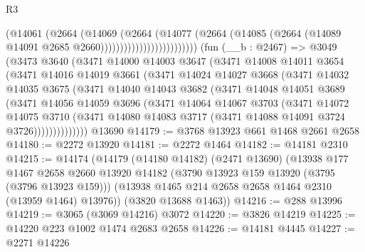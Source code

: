 \begin{lexlean}{R3}
\begin{coremodule}
                                    (@14061
                                      (@2664
                                        (@14069
                                          (@2664
                                            (@14077
                                              (@2664
                                                (@14085
                                                  (@2664
                                                    (@14089
                                                      @14091
                                                      @2685
                                                      @2660)))))))))))))))))))))))))
    (fun (__b : @2467) =>
    @3049
      (@3473
        @3640
        (@3471
          @14000
          @14003
          @3647
          (@3471
            @14008
            @14011
            @3654
            (@3471
              @14016
              @14019
              @3661
              (@3471
                @14024
                @14027
                @3668
                (@3471
                  @14032
                  @14035
                  @3675
                  (@3471
                    @14040
                    @14043
                    @3682
                    (@3471
                      @14048
                      @14051
                      @3689
                      (@3471
                        @14056
                        @14059
                        @3696
                        (@3471
                          @14064
                          @14067
                          @3703
                          (@3471
                            @14072
                            @14075
                            @3710
                            (@3471
                              @14080
                              @14083
                              @3717
                              (@3471 @14088 @14091 @3724 @3726))))))))))))))
    @13690
@14179 := @3768 @13923 @661 @1468 @2661 @2658
@14180 := @2272 @13920
@14181 := @2272 @1464
@14182 := @14181 @2310
@14215 := @14174
    (@14179
      (@14180 @14182)
      (@2471 @13690)
      (@13938
        @177
        @1467
        @2658
        @2660
        @13920
        @14182
        (@3790 @13923 @159 @13920 (@3795 (@3796 @13923 @159)))
        (@13938 @1465 @214 @2658 @2658 @1464 @2310 (@13959 @1464) @13976))
      (@3820 @13688 @1463))
@14216 := @288 @13996
@14219 := @3065 (@3069 @14216) @3072
@14220 := @3826 @14219
@14225 := @14220 @223 @1002 @1474 @2683 @2658
@14226 := @14181 @4445
@14227 := @2271 @14226

\end{coremodule}
\end{lexlean}

